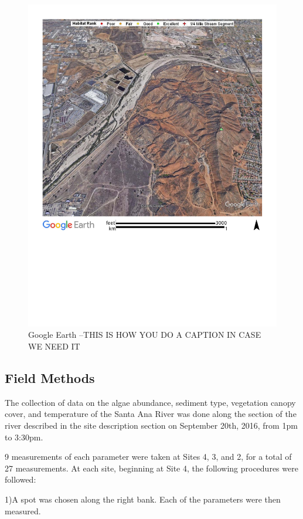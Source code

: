 \documentclass{article}
\begin{document}
\begin{figure}
\includegraphics[width=1.00\textwidth]{Figures/SantaAna_SatelliteImage}
\caption{Google Earth --THIS IS HOW YOU DO A CAPTION IN CASE WE NEED IT}
\label{SAR_Image}
\end{figure}

\subsection{Field Methods}
The collection of data on the algae abundance, sediment type, vegetation canopy cover, 
and temperature of the Santa Ana River was done along the section of the river described
in the site description section on September 20th, 2016, from 1pm to 3:30pm.

9 measurements of each parameter were taken at Sites 4, 3, and 2, for a total of 27 measurements. 
At each site, beginning at Site 4, the following procedures were followed: 

1)A spot was chosen along the right bank. Each of the parameters were then measured.
\end{document}
